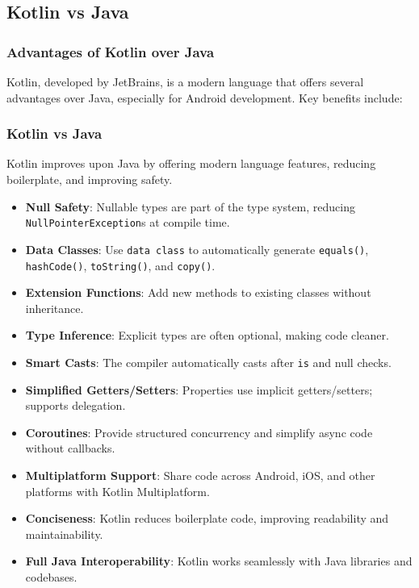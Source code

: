 \documentclass[a4paper,12pt]{article}
\begin{document}
\subsection{Kotlin vs Java}

\subsubsection{Advantages of Kotlin over Java}

Kotlin, developed by JetBrains, is a modern language that offers several advantages over Java, especially for Android development. Key benefits include:

\subsubsection{Kotlin vs Java}

Kotlin improves upon Java by offering modern language features, reducing boilerplate, and improving safety.

\begin{itemize}
  \item \textbf{Null Safety}: Nullable types are part of the type system, reducing \texttt{NullPointerException}s at compile time.
  \item \textbf{Data Classes}: Use \texttt{data class} to automatically generate \texttt{equals()}, \texttt{hashCode()}, \texttt{toString()}, and \texttt{copy()}.
  \item \textbf{Extension Functions}: Add new methods to existing classes without inheritance.
  \item \textbf{Type Inference}: Explicit types are often optional, making code cleaner.
  \item \textbf{Smart Casts}: The compiler automatically casts after \texttt{is} and null checks.
  \item \textbf{Simplified Getters/Setters}: Properties use implicit getters/setters; supports delegation.
  \item \textbf{Coroutines}: Provide structured concurrency and simplify async code without callbacks.
  \item \textbf{Multiplatform Support}: Share code across Android, iOS, and other platforms with Kotlin Multiplatform.
  \item \textbf{Conciseness}: Kotlin reduces boilerplate code, improving readability and maintainability.
  \item \textbf{Full Java Interoperability}: Kotlin works seamlessly with Java libraries and codebases.
\end{itemize}
\end{document}

